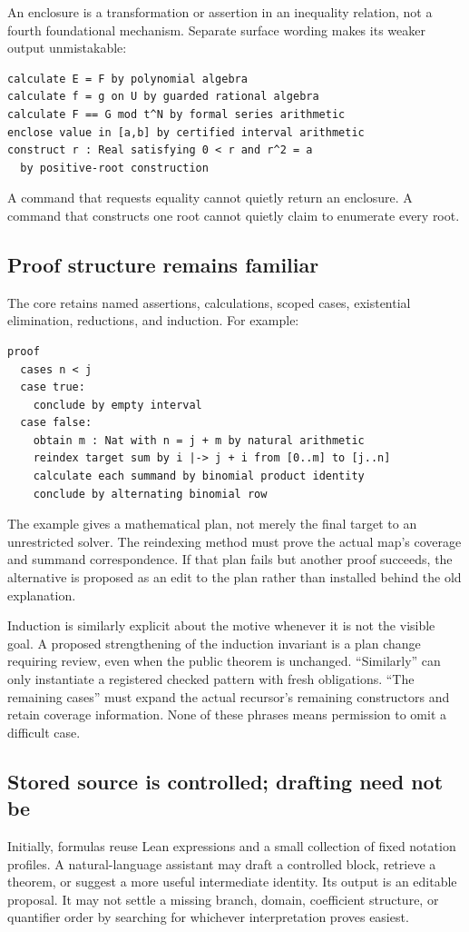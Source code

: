 \documentclass[11pt,a4paper]{article}
\theoremstyle{remark}\newtheorem{example}[proposition]{Example}
\begin{document}
An enclosure is a transformation or assertion in an inequality relation, not a fourth foundational mechanism. Separate surface wording makes its weaker output unmistakable:
\begin{lstlisting}
calculate E = F by polynomial algebra
calculate f = g on U by guarded rational algebra
calculate F == G mod t^N by formal series arithmetic
enclose value in [a,b] by certified interval arithmetic
construct r : Real satisfying 0 < r and r^2 = a
  by positive-root construction
\end{lstlisting}
A command that requests equality cannot quietly return an enclosure. A command that constructs one root cannot quietly claim to enumerate every root.

\subsection{Proof structure remains familiar}
The core retains named assertions, calculations, scoped cases, existential elimination, reductions, and induction. For example:
\begin{lstlisting}
proof
  cases n < j
  case true:
    conclude by empty interval
  case false:
    obtain m : Nat with n = j + m by natural arithmetic
    reindex target sum by i |-> j + i from [0..m] to [j..n]
    calculate each summand by binomial product identity
    conclude by alternating binomial row
\end{lstlisting}
The example gives a mathematical plan, not merely the final target to an unrestricted solver. The reindexing method must prove the actual map's coverage and summand correspondence. If that plan fails but another proof succeeds, the alternative is proposed as an edit to the plan rather than installed behind the old explanation.

Induction is similarly explicit about the motive whenever it is not the visible goal. A proposed strengthening of the induction invariant is a plan change requiring review, even when the public theorem is unchanged. ``Similarly'' can only instantiate a registered checked pattern with fresh obligations. ``The remaining cases'' must expand the actual recursor's remaining constructors and retain coverage information. None of these phrases means permission to omit a difficult case.

\subsection{Stored source is controlled; drafting need not be}
Initially, formulas reuse Lean expressions and a small collection of fixed notation profiles. A natural-language assistant may draft a controlled block, retrieve a theorem, or suggest a more useful intermediate identity. Its output is an editable proposal. It may not settle a missing branch, domain, coefficient structure, or quantifier order by searching for whichever interpretation proves easiest.
\end{document}
